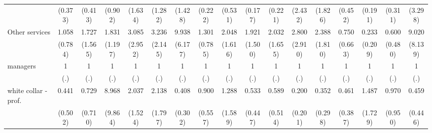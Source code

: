 {\begin{tabular}{l*{16}{c}}
                    &     (0.373)         &     (0.413)         &     (0.902)         &     (1.634)         &     (1.282)         &     (1.428)         &     (0.222)         &     (0.531)         &     (0.177)         &     (0.221)         &     (2.432)         &     (1.826)         &     (0.452)         &     (0.191)         &     (0.311)         &     (3.298)         \\
[1em]
Other services      &       1.058         &       1.727         &       1.831         &       3.085         &       3.236         &       9.938\sym{***}&       1.301         &       2.048         &       1.921         &       2.032         &       2.800         &       2.388         &       0.750         &       0.233         &       0.600         &       9.020\sym{*}  \\
                    &     (0.784)         &     (1.565)         &     (1.197)         &     (2.952)         &     (2.145)         &     (6.177)         &     (0.785)         &     (1.616)         &     (1.500)         &     (1.655)         &     (2.910)         &     (1.810)         &     (0.663)         &     (0.209)         &     (0.480)         &     (8.139)         \\
[1em]
managers            &           1         &           1         &           1         &           1         &           1         &           1         &           1         &           1         &           1         &           1         &           1         &           1         &           1         &           1         &           1         &           1         \\
                    &         (.)         &         (.)         &         (.)         &         (.)         &         (.)         &         (.)         &         (.)         &         (.)         &         (.)         &         (.)         &         (.)         &         (.)         &         (.)         &         (.)         &         (.)         &         (.)         \\
[1em]
white collar - prof.&       0.441         &       0.729         &       8.968\sym{*}  &       2.037         &       2.138         &       0.408         &       0.900         &       1.288         &       0.533         &       0.589         &       0.200         &       0.352         &       0.461         &       1.487         &       0.970         &       0.459         \\
                    &     (0.502)         &     (0.710)         &     (9.864)         &     (1.524)         &     (1.797)         &     (0.302)         &     (0.557)         &     (1.589)         &     (0.447)         &     (0.514)         &     (0.201)         &     (0.298)         &     (0.387)         &     (1.729)         &     (0.950)         &     (0.446)         \\

\end{tabular}}
